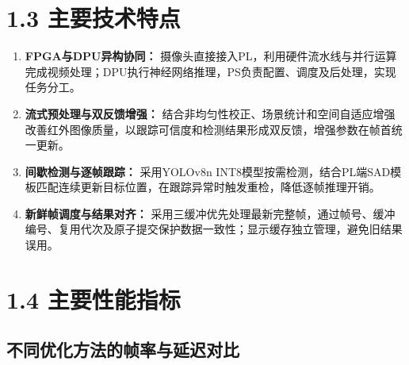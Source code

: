 \documentclass[UTF8,a4paper,12pt,fontset=windows]{ctexart}
\renewcommand{\arraystretch}{1.25}
\begin{document}
\section*{1.3 主要技术特点}

\begin{enumerate}
    \item \textbf{FPGA与DPU异构协同：}
    摄像头直接接入PL，利用硬件流水线与并行运算完成视频处理；DPU执行神经网络推理，PS负责配置、调度及后处理，实现任务分工。

    \item \textbf{流式预处理与双反馈增强：}
    结合非均匀性校正、场景统计和空间自适应增强改善红外图像质量，以跟踪可信度和检测结果形成双反馈，增强参数在帧首统一更新。

    \item \textbf{间歇检测与逐帧跟踪：}
    采用YOLOv8n INT8模型按需检测，结合PL端SAD模板匹配连续更新目标位置，在跟踪异常时触发重检，降低逐帧推理开销。

    \item \textbf{新鲜帧调度与结果对齐：}
    采用三缓冲优先处理最新完整帧，通过帧号、缓冲编号、复用代次及原子提交保护数据一致性；显示缓存独立管理，避免旧结果误用。
\end{enumerate}


\section*{1.4 主要性能指标}


\subsection*{不同优化方法的帧率与延迟对比}

\begingroup
\small
\setlength{\tabcolsep}{5pt}
\renewcommand{\arraystretch}{1.3}
\end{document}
